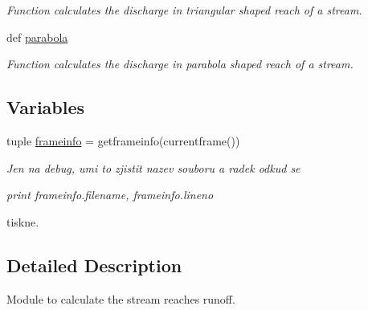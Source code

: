 \begin{DoxyCompactItemize}
\begin{DoxyCompactList}\small\item\em Function calculates the discharge in triangular shaped reach of a stream. \end{DoxyCompactList}\item 
\hypertarget{namespacesmoderp2d_1_1src_1_1stream__functions_1_1stream__f_ac43bbcb06155e2a19adcab176b0511ae}{def \hyperlink{namespacesmoderp2d_1_1src_1_1stream__functions_1_1stream__f_ac43bbcb06155e2a19adcab176b0511ae}{parabola}}\label{namespacesmoderp2d_1_1src_1_1stream__functions_1_1stream__f_ac43bbcb06155e2a19adcab176b0511ae}

\begin{DoxyCompactList}\small\item\em Function calculates the discharge in parabola shaped reach of a stream. \end{DoxyCompactList}\end{DoxyCompactItemize}
\subsection*{Variables}
\begin{DoxyCompactItemize}
\item 
\hypertarget{namespacesmoderp2d_1_1src_1_1stream__functions_1_1stream__f_af93ee46218e8b8c2f0807f89f8e1b298}{tuple \hyperlink{namespacesmoderp2d_1_1src_1_1stream__functions_1_1stream__f_af93ee46218e8b8c2f0807f89f8e1b298}{frameinfo} = getframeinfo(currentframe())}\label{namespacesmoderp2d_1_1src_1_1stream__functions_1_1stream__f_af93ee46218e8b8c2f0807f89f8e1b298}

\begin{DoxyCompactList}\small\item\em Jen na debug, umi to zjistit nazev souboru a radek odkud se\par
 {\itshape print frameinfo.\-filename, frameinfo.\-lineno}\par
 tiskne. \end{DoxyCompactList}\end{DoxyCompactItemize}


\subsection{Detailed Description}
Module to calculate the stream reaches runoff. 

